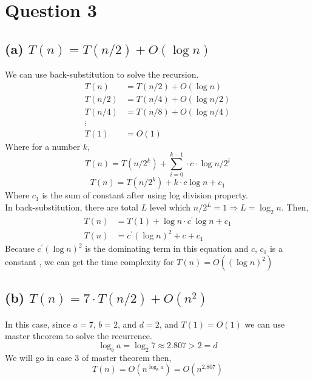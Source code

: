 \documentclass{article}
\begin{document}
\section*{Question 3}
\subsection*{(a) $T(n) = T(n/2) + O(\log n)$}
We can use back-substitution to solve the recursion.
    \begin{align}
        T(n) & = T(n/2) + O(\log n) \nonumber \\
        T(n/2) & = T(n/4) +  O(\log n/2) \nonumber \\
        T(n/4) &= T(n/8) + O(\log n/4) \nonumber \\
        \vdots \nonumber \\
        T(1) &= O(1) \nonumber
    \end{align}
Where for a number $k$,
$$T(n) = T(n/2^k) + \sum_{i=0}^{k-1}\cdot c \cdot  \log n/2^i$$
$$T(n) = T(n/2^k) + k \cdot   c \log n + c_1$$
Where $c_1$ is the sum of constant after using log division property.\\
In back-substitution, there are total $L$ level which $n/2^L = 1 \Rightarrow L = \log_2 n$.
Then, 
    \begin{align}
        T(n) &= T(1) + \log n \cdot c^\prime \log n + c_1 \nonumber \\
        T(n) &= c^\prime (\log n)^2 +  c + c_1 \nonumber 
    \end{align}
    Because $c^\prime  (\log n)^2$ is the dominating term in this equation and $c$, $c_1$ is a constant
    , we can get the time complexity for $T(n) = O((\log n)^2)$

\subsection*{(b) $T(n) = 7\cdot T(n/2) + O(n^2)$}
In this case, since $a = 7$, $b = 2$, and $d = 2$, and $T(1) = O(1)$ we can use master theorem to solve the recurrence.
$$\log_b a = \log_2 7 \approx 2.807 > 2 = d $$
We will go in case 3 of master theorem then,
$$T(n) = O(n^{\log_b a}) = O(n^{2.807})$$
\end{document}

